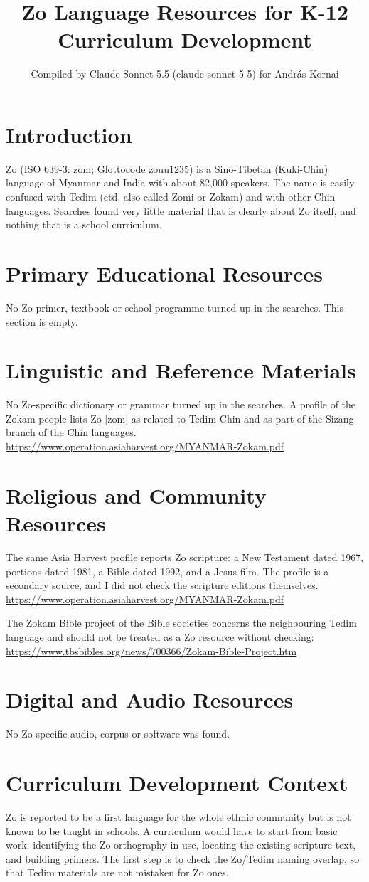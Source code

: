 \documentclass[12pt]{article}
\title{Zo Language Resources for K-12 Curriculum Development}
\author{Compiled by Claude Sonnet 5.5 (claude-sonnet-5-5) for Andr\'as Kornai}
\date{}
\begin{document}
\maketitle

\section{Introduction}
Zo (ISO 639-3: zom; Glottocode zouu1235) is a Sino-Tibetan (Kuki-Chin) language of Myanmar and India with about 82,000 speakers. The name is easily confused with Tedim (ctd, also called Zomi or Zokam) and with other Chin languages. Searches found very little material that is clearly about Zo itself, and nothing that is a school curriculum.

\section{Primary Educational Resources}
No Zo primer, textbook or school programme turned up in the searches. This section is empty.

\section{Linguistic and Reference Materials}
No Zo-specific dictionary or grammar turned up in the searches. A profile of the Zokam people lists Zo [zom] as related to Tedim Chin and as part of the Sizang branch of the Chin languages. \url{https://www.operation.asiaharvest.org/MYANMAR-Zokam.pdf}

\section{Religious and Community Resources}
The same Asia Harvest profile reports Zo scripture: a New Testament dated 1967, portions dated 1981, a Bible dated 1992, and a Jesus film. The profile is a secondary source, and I did not check the scripture editions themselves.
\url{https://www.operation.asiaharvest.org/MYANMAR-Zokam.pdf}

The Zokam Bible project of the Bible societies concerns the neighbouring Tedim language and should not be treated as a Zo resource without checking: \url{https://www.tbsbibles.org/news/700366/Zokam-Bible-Project.htm}

\section{Digital and Audio Resources}
No Zo-specific audio, corpus or software was found.

\section{Curriculum Development Context}
Zo is reported to be a first language for the whole ethnic community but is not known to be taught in schools. A curriculum would have to start from basic work: identifying the Zo orthography in use, locating the existing scripture text, and building primers. The first step is to check the Zo/Tedim naming overlap, so that Tedim materials are not mistaken for Zo ones.
\end{document}
